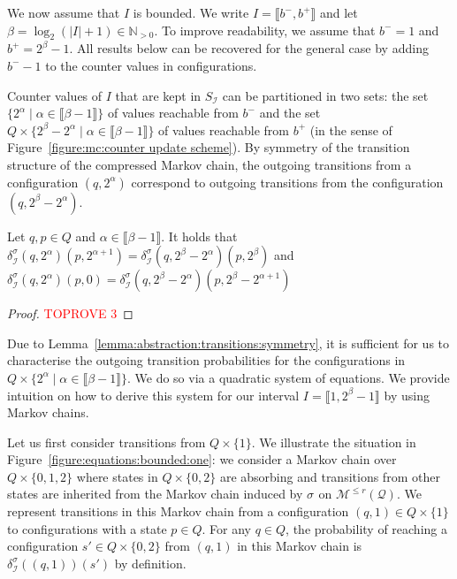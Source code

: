\documentclass[a4paper,UKenglish,cleveref,autoref,thm-restate,colorlinks]{lipics-v2021}
\newcommand{\integerInterval}[1]{\llbracket{}#1\rrbracket{}}
\newcommand{\IN}{\mathbb{N}}
\newcommand{\INpos}{\IN_{>0}}
\newcommand{\mdp}{\mathcal{M}}
\newcommand{\mdpStateSpace}{S}
\newcommand{\mdpTrans}{\delta}
\newcommand{\ocmdp}{\mathcal{Q}}
\newcommand{\ocmdpFin}[2]{\mdp^{\leq #2}(#1)}
\newcommand{\ocStateSpace}{Q}
\newcommand{\ocState}{q}
\newcommand{\ocStateB}{p}
\newcommand{\ocConfig}{s}
\newcommand{\counterUB}{r}
\newcommand{\intPart}{\mathcal{I}}
\newcommand{\interval}{I}
\newcommand{\intBound}{b}
\newcommand{\intLB}{\intBound^-}
\newcommand{\intUB}{\intBound^+}
\newcommand{\powerIndex}{\alpha}
\newcommand{\powerMax}{\beta}
\newcommand{\compressChainStateSpace}{\mdpStateSpace_{\intPart}}
\newcommand{\compressChainTransTemplate}[2]{\mdpTrans^{#1}_{#2}}
\newcommand{\compressChainTrans}{\compressChainTransTemplate{\strat}{\intPart}}
\newcommand{\stratGeneric}[1]{{\sigma_{#1}}}
\newcommand{\strat}{\stratGeneric{}}
\begin{document}
We now assume that $\interval$ is bounded.
We write $\interval=\integerInterval{\intLB, \intUB}$ and let $\powerMax=\log_2(|\interval|+1)\in\INpos$.
To improve readability, we assume that $\intLB = 1$ and $\intUB = 2^\powerMax-1$.
All results below can be recovered for the general case by adding $\intLB-1$ to the counter values in configurations.

Counter values of $\interval$ that are kept in $\compressChainStateSpace$ can be partitioned in two sets: the set $\{2^{\powerIndex} \mid \powerIndex\in\integerInterval{\powerMax-1}\}$ of values reachable from $\intLB$ and the set $\ocStateSpace\times\{2^{\powerMax} - 2^{\powerIndex} \mid \powerIndex\in\integerInterval{\powerMax-1}\}$ of values reachable from $\intUB$ (in the sense of Figure~\ref{figure:mc:counter update scheme}).
By symmetry of the transition structure of the compressed Markov chain, the outgoing transitions from a configuration $(\ocState, 2^\powerIndex)$ correspond to outgoing transitions from the configuration $(\ocState, 2^\powerMax-2^\powerIndex)$.

\begin{lemma}\label{lemma:abstraction:transitions:symmetry}
  Let $\ocState, \ocStateB\in\ocStateSpace$ and $\powerIndex\in\integerInterval{\powerMax-1}$.
  It holds that $\compressChainTrans(\ocState, 2^\powerIndex)(\ocStateB, 2^{\powerIndex+1}) = \compressChainTrans(\ocState, 2^\powerMax-2^\powerIndex)(\ocStateB, 2^\powerMax)$ and $\compressChainTrans(\ocState, 2^\powerIndex)(\ocStateB, 0) = \compressChainTrans(\ocState, 2^\powerMax-2^\powerIndex)(\ocStateB, 2^ \powerMax - 2^{\powerIndex+1})$
\end{lemma}
\begin{proof}\textcolor{red}{TOPROVE 3}\end{proof}

Due to Lemma~\ref{lemma:abstraction:transitions:symmetry}, it is sufficient for us to characterise the outgoing transition probabilities for the configurations in $\ocStateSpace\times\{2^{\powerIndex} \mid \powerIndex\in\integerInterval{\powerMax-1}\}$.
We do so via a quadratic system of equations.
We provide intuition on how to derive this system for our interval $\interval=\integerInterval{1, 2^\powerMax-1}$ by using Markov chains. 

Let us first consider transitions from $\ocStateSpace\times\{1\}$. We illustrate the situation in Figure~\ref{figure:equations:bounded:one}: we consider a Markov chain over $\ocStateSpace\times\{0, 1, 2\}$ where states in $\ocStateSpace\times\{0, 2\}$ are absorbing and transitions from other states are inherited from the Markov chain induced by $\strat$ on $\ocmdpFin{\ocmdp}{\counterUB}$.
We represent transitions in this Markov chain from a configuration $(\ocState, 1)\in\ocStateSpace\times\{1\}$ to configurations with a state $\ocStateB\in\ocStateSpace$.
For any $\ocState\in\ocStateSpace$, the probability of reaching a configuration $\ocConfig'\in\ocStateSpace\times\{0, 2\}$ from $(\ocState, 1)$ in this Markov chain is $\compressChainTrans((\ocState, 1))(\ocConfig')$ by definition.
\end{document}
